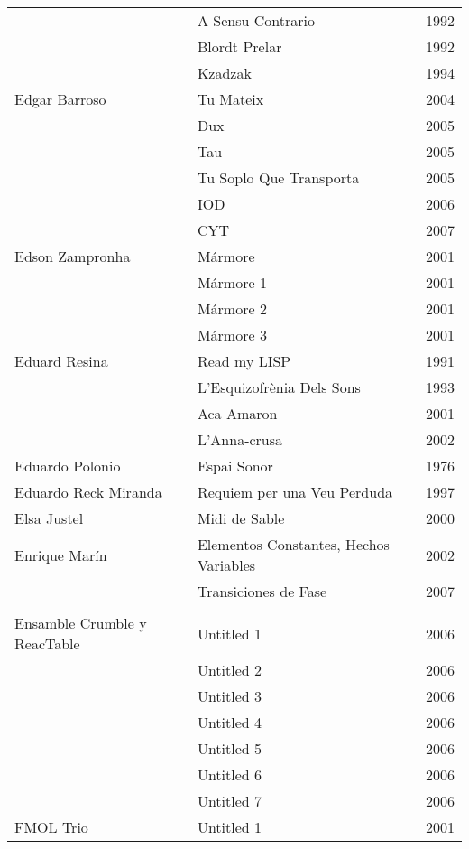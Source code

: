 \begin{center}
\begin{longtable}{ p{}  p{}  p{} }
& A Sensu Contrario & 1992 \\ \cmidrule (r){2-3} 
& Blordt Prelar & 1992 \\ \cmidrule (r){2-3} 
& Kzadzak & 1994 \\ \midrule 
Edgar Barroso & Tu Mateix & 2004 \\ \cmidrule (r){2-3} 
& Dux & 2005 \\ \cmidrule (r){2-3} 
& Tau & 2005 \\ \cmidrule (r){2-3} 
& Tu Soplo Que Transporta & 2005 \\ \cmidrule (r){2-3} 
& IOD & 2006 \\ \cmidrule (r){2-3} 
& CYT & 2007 \\ \midrule 
Edson Zampronha & Mármore & 2001 \\ \cmidrule (r){2-3} 
& Mármore 1 & 2001 \\ \cmidrule (r){2-3} 
& Mármore 2 & 2001 \\ \cmidrule (r){2-3} 
& Mármore 3 & 2001 \\ \midrule 
Eduard Resina & Read my LISP & 1991 \\ \cmidrule (r){2-3} 
& L'Esquizofrènia Dels Sons & 1993 \\ \cmidrule (r){2-3} 
& Aca Amaron & 2001 \\ \cmidrule (r){2-3} 
& L'Anna-crusa & 2002 \\ \midrule 
Eduardo Polonio & Espai Sonor & 1976 \\ \midrule 
Eduardo Reck Miranda & Requiem per una Veu Perduda & 1997 \\ \midrule 
Elsa Justel & Midi de Sable & 2000 \\ \midrule 
Enrique Marín & Elementos Constantes, Hechos Variables & 2002 \\ \cmidrule (r){2-3} 
& Transiciones de Fase & 2007 \\ \midrule \\ \midrule  
Ensamble Crumble y ReacTable & Untitled 1 & 2006 \\ \cmidrule (r){2-3} 
& Untitled 2 & 2006 \\ \cmidrule (r){2-3} 
& Untitled 3 & 2006 \\ \cmidrule (r){2-3} 
& Untitled 4 & 2006 \\ \cmidrule (r){2-3} 
& Untitled 5 & 2006 \\ \cmidrule (r){2-3} 
& Untitled 6 & 2006 \\ \cmidrule (r){2-3} 
& Untitled 7 & 2006 \\ \midrule 
FMOL Trio & Untitled 1 & 2001 \\ \cmidrule (r){2-3} 

\end{longtable}
\end{center}

